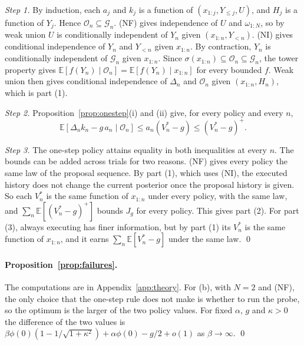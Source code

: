 \emph{Step 1.} By induction, each $a_j$ and $k_j$ is a function of $(x_{1:j},Y_{\le j},U)$, and $H_j$ is a function of $Y_j$. Hence $\mathcal{O}_n\subseteq\mathcal{G}_n$. (NF) gives independence of $U$ and $\omega_{1:N}$, so by weak union $U$ is conditionally independent of $Y_n$ given $(x_{1:n},Y_{<n})$. (NI) gives conditional independence of $Y_n$ and $Y_{<n}$ given $x_{1:n}$. By contraction, $Y_n$ is conditionally independent of $\mathcal{G}_n$ given $x_{1:n}$. Since $\sigma(x_{1:n})\subseteq\mathcal{O}_n\subseteq\mathcal{G}_n$, the tower property gives $\mathbb{E}[f(Y_n)\mid\mathcal{O}_n]=\mathbb{E}[f(Y_n)\mid x_{1:n}]$ for every bounded $f$. Weak union then gives conditional independence of $\Delta_n$ and $\mathcal{O}_n$ given $(x_{1:n},H_n)$, which is part (1).

\emph{Step 2.} Proposition~\ref{prop:onestep}(i) and (ii) give, for every policy and every $n$,
\[
\mathbb{E}[\Delta_nk_n-g\,a_n\mid\mathcal{O}_n]\le a_n(V^*_n-g)\le(V^*_n-g)^+ .
\]

\emph{Step 3.} The one-step policy attains equality in both inequalities at every $n$. The bounds can be added across trials for two reasons. (NF) gives every policy the same law of the proposal sequence. By part (1), which uses (NI), the executed history does not change the current posterior once the proposal history is given. So each $V^*_n$ is the same function of $x_{1:n}$ under every policy, with the same law, and $\sum_n\mathbb{E}[(V^*_n-g)^+]$ bounds $J_g$ for every policy. This gives part (2). For part (3), always executing has finer information, but by part (1) its $V^*_n$ is the same function of $x_{1:n}$, and it earns $\sum_n\mathbb{E}[V^*_n-g]$ under the same law. \qed

\paragraph{Proposition~\ref{prop:failures}.}
The computations are in Appendix~\ref{app:theory}. For (b), with $N=2$ and (NF), the only choice that the one-step rule does not make is whether to run the probe, so the optimum is the larger of the two policy values. For fixed $\alpha$, $g$ and $\kappa>0$ the difference of the two values is $\beta\phi(0)(1-1/\sqrt{1+\kappa^2})+\alpha\phi(0)-g/2+o(1)$ as $\beta\to\infty$. \qed


